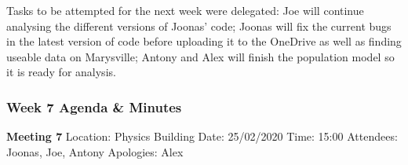 \noindent Tasks to be attempted for the next week were delegated: Joe will continue analysing the different versions of Joonas’ code; Joonas will fix the current bugs in the latest version of code before uploading it to the OneDrive as well as finding useable data on Marysville; Antony and Alex will finish the population model so it is ready for analysis.

\subsubsection*{Week 7 Agenda \& Minutes}
\textbf{Meeting 7}\newline
Location: Physics Building\newline
Date: 25/02/2020\newline
Time: 15:00\newline
Attendees: Joonas, Joe, Antony\newline
Apologies: Alex

